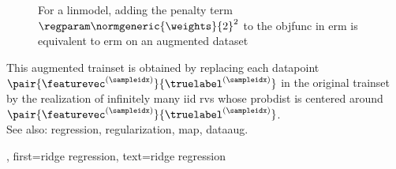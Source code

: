 {{\begin{figure}[H]
\begin{center}
				\caption{For a \gls{linmodel}, adding the penalty term $\regparam \normgeneric{\weights}{2}^2$ to 
				the \gls{objfunc} in \gls{erm} is equivalent to \gls{erm} on an augmented \gls{dataset}  \label{fig_ridge_regression_dict} }
			\end{center}
		\end{figure} 
		This augmented 
		\gls{trainset} is obtained by replacing each \gls{datapoint} 
		$\pair{\featurevec^{(\sampleidx)}}{\truelabel^{(\sampleidx)}}$ 
		in the original \gls{trainset} by the \gls{realization} of infinitely 
		many \gls{iid} \glspl{rv} whose \gls{probdist} is centered around 
		$\pair{\featurevec^{(\sampleidx)}}{\truelabel^{(\sampleidx)}}$.
	    		\\
		See also: \gls{regression}, \gls{regularization}, \gls{map}, \gls{dataaug}.},
	first={ridge regression},
	text={ridge regression}
}


